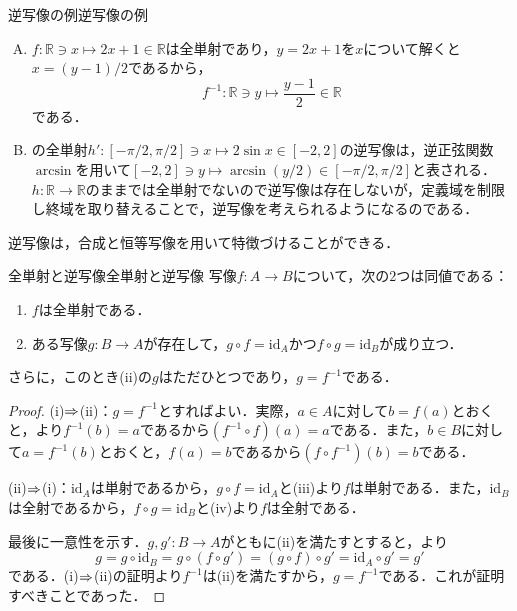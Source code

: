 \begin{example}{逆写像の例}{逆写像の例}
  \begin{enumerate}[(A)]
    \item $f \colon \mathbb{R} \ni x \mapsto 2x + 1 \in \mathbb{R}$は全単射であり，$y = 2x + 1$を$x$について解くと$x = (y - 1)/2$であるから，
          \[
            f^{-1} \colon \mathbb{R} \ni y \mapsto \frac{y - 1}{2} \in \mathbb{R}
          \]
          である．
    \item {}の全単射$h' \colon [-\pi/2, \pi/2] \ni x \mapsto 2 \sin x \in [-2, 2]$の逆写像は，逆正弦関数$\arcsin$を用いて$[-2, 2] \ni y \mapsto \arcsin (y/2) \in [-\pi/2, \pi/2]$と表される．
          $h \colon \mathbb{R} \to \mathbb{R}$のままでは全単射でないので逆写像は存在しないが，定義域を制限し終域を取り替えることで，逆写像を考えられるようになるのである．
  \end{enumerate}
\end{example}

逆写像は，合成と恒等写像を用いて特徴づけることができる．

\begin{theorem}{全単射と逆写像}{全単射と逆写像}
  写像$f \colon A \to B$について，次の$2$つは同値である：
  \begin{enumerate}[label=(\roman*),leftmargin=3.2em]
    \item $f$は全単射である．
    \item ある写像$g \colon B \to A$が存在して，$g \circ f = \mathrm{id}_A$かつ$f \circ g = \mathrm{id}_B$が成り立つ．
  \end{enumerate}
  さらに，このとき(ii)の$g$はただひとつであり，$g = f^{-1}$である．
\end{theorem}

\begin{tleftbar}
  \begin{proof}
    (i)$\mathrel{\Rightarrow}$(ii)：$g = f^{-1}$とすればよい．実際，$a \in A$に対して$b = f(a)$とおくと，より$f^{-1}(b) = a$であるから$(f^{-1} \circ f)(a) = a$である．また，$b \in B$に対して$a = f^{-1}(b)$とおくと，$f(a) = b$であるから$(f \circ f^{-1})(b) = b$である．

    (ii)$\mathrel{\Rightarrow}$(i)：$\mathrm{id}_A$は単射であるから，$g \circ f = \mathrm{id}_A$と(iii)より$f$は単射である．また，$\mathrm{id}_B$は全射であるから，$f \circ g = \mathrm{id}_B$と(iv)より$f$は全射である．

    最後に一意性を示す．$g, g' \colon B \to A$がともに(ii)を満たすとすると，より
    \[
      g = g \circ \mathrm{id}_B = g \circ (f \circ g') = (g \circ f) \circ g' = \mathrm{id}_A \circ g' = g'
    \]
    である．(i)$\mathrel{\Rightarrow}$(ii)の証明より$f^{-1}$は(ii)を満たすから，$g = f^{-1}$である．これが証明すべきことであった．
  \end{proof}
\end{tleftbar}

